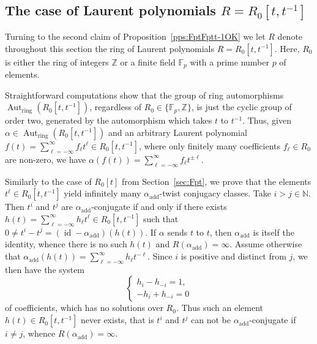 \documentclass[a4paper,11pt]{amsart}
\numberwithin{equation}{section}
\theoremstyle{plain}
\theoremstyle{definition}
\newcommand{\N}{\mathbb{N}}
\newcommand{\Z}{\mathbb{Z}}
\newcommand{\F}{\mathbb{F}}
\newcommand{\laurent}[1]{#1[t,t^{-1}]}
\newcommand{\anel}[1]{#1_{\text{ring}}} %
\newcommand{\addi}[1]{#1_{\text{add}}} %
\DeclareMathOperator{\Aut}{Aut}
\DeclareMathOperator{\id}{id}
\begin{document}
\subsection{The case of Laurent polynomials \texorpdfstring{$R = \laurent{R_0}$}{R = R0[t,1/t]}} \label{sec:RinftyFptt-1} Turning to the second claim of Proposition~\ref{pps:FptFptt-1OK} we let $R$ denote throughout this section the ring of Laurent polynomials $R = R_0[t,t^{-1}]$. Here, $R_0$ is either the ring of integers $\Z$ or a finite field $\F_p$ with a prime number $p$ of elements.

Straightforward computations show that the group of ring automorphisms $\anel{\Aut}(\laurent{R_0})$, regardless of $R_0 \in \{\F_p,\Z\}$, is just the cyclic group of order two, generated by the automorphism which takes $t$ to $t^{-1}$. Thus, given $\alpha \in \anel{\Aut}(\laurent{R_0})$ and an arbitrary Laurent polynomial $f(t) = \sum_{\ell=-\infty}^\infty f_\ell t^\ell \in \laurent{R_0}$, where only finitely many coefficients $f_\ell\in R_0$ are non-zero, we have $\alpha(f(t)) = \sum_{\ell=-\infty}^\infty f_\ell t^{\pm \ell}$. 

Similarly to the case of $R_0[t]$ from Section~\ref{sec:Fpt}, we prove that the elements $t^\ell \in \laurent{R_0}$ yield infinitely many $\addi{\alpha}$-twist conjugacy classes. Take $i > j \in \N$. Then $t^i$ and $t^j$ are $\addi{\alpha}$-conjugate if and only if there exists $h(t) = \sum_{\ell=-\infty}^\infty h_\ell t^\ell \in \laurent{R_0}$ such that $0\neq t^i - t^j = (\id-\addi{\alpha})(h(t))$. If $\alpha$ sends $t$ to $t$, then $\addi{\alpha}$ is itself the identity, whence there is no such $h(t)$ and $R(\addi{\alpha}) = \infty$. Assume otherwise that $\addi{\alpha}(h(t)) =  \sum_{\ell=-\infty}^\infty h_\ell t^{-\ell}$. Since $i$ is positive and distinct from $j$, we then have the system 
\[ \begin{cases}
 h_i - h_{-i} = 1, \\
 -h_i + h_{-i} = 0
\end{cases}\]
of coefficients, which has no solutions over $R_0$. Thus such an element $h(t) \in \laurent{R_0}$ never exists, that is $t^i$ and $t^j$ can not be $\addi{\alpha}$-conjugate if $i \neq j$, whence $R(\addi{\alpha}) = \infty$.
\end{document}
